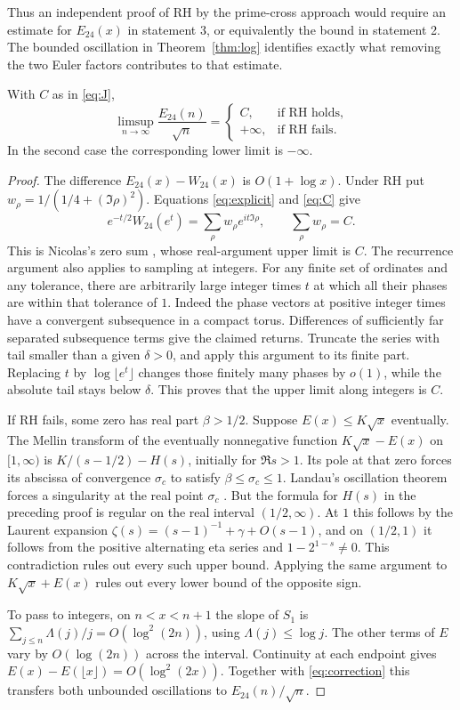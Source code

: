 Thus an independent proof of RH by the prime-cross approach would
require an estimate for $E_{24}(x)$ in statement 3, or equivalently
the bound in statement 2. The bounded oscillation in
Theorem~\ref{thm:log} identifies exactly what removing the two Euler
factors contributes to that estimate.
\begin{cor}\label{cor:limsup}
With $C$ as in \eqref{eq:J},
\[
 \limsup_{n\to\infty}\frac{E_{24}(n)}{\sqrt n}=
 \begin{cases}
 C,&\text{if RH holds},\\
 +\infty,&\text{if RH fails}.
 \end{cases}
\]
In the second case the corresponding lower limit is $-\infty$.
\end{cor}
\begin{proof}
The difference $E_{24}(x)-W_{24}(x)$ is $O(1+\log x)$.
Under RH put $w_\rho=1/(1/4+(\Im\rho)^2)$. Equations
\eqref{eq:explicit} and \eqref{eq:C} give
\[
 e^{-t/2}W_{24}(e^t)=\sum_\rho w_\rho e^{it\Im\rho},
 \qquad \sum_\rho w_\rho=C.
\]
This is Nicolas's zero sum \cite[(1.18)--(1.19), Section~4]{nicolas},
whose real-argument upper limit is $C$. The recurrence argument also
applies to sampling at integers. For any finite set of ordinates and any tolerance, there are
arbitrarily large integer times $t$ at which all their phases are
within that tolerance of $1$. Indeed the phase vectors at positive
integer times have a convergent subsequence in a compact torus.
Differences of sufficiently far separated subsequence terms give the
claimed returns. Truncate the series with tail smaller than a given
$\delta>0$, and apply this argument to its finite part. Replacing
$t$ by $\log\lfloor e^t\rfloor$ changes those finitely many phases
by $o(1)$, while the absolute tail stays below $\delta$. This proves
that the upper limit along integers is $C$.

If RH fails, some zero has real part $\beta>1/2$. Suppose
$E(x)\leq K\sqrt{x}$ eventually. The Mellin transform of the
eventually nonnegative function $K\sqrt{x}-E(x)$ on $[1,\infty)$
is $K/(s-1/2)-H(s)$, initially for $\Re s>1$. Its pole at that zero
forces its abscissa of convergence $\sigma_c$ to satisfy
$\beta\leq\sigma_c\leq1$. Landau's oscillation theorem forces a
singularity at the real point $\sigma_c$ \cite[Theorem 3]{lay}.
But the formula for $H(s)$ in the preceding proof is regular on
the real interval $(1/2,\infty)$. At $1$ this follows by the
Laurent expansion $\zeta(s)=(s-1)^{-1}+\gamma+O(s-1)$, and on
$(1/2,1)$ it follows from the positive alternating eta series and
$1-2^{1-s}\ne0$. This contradiction rules out every such upper
bound. Applying the same argument to $K\sqrt{x}+E(x)$ rules out
every lower bound of the opposite sign.

To pass to integers, on $n<x<n+1$ the slope of $S_1$ is
$\sum_{j\leq n}\Lambda(j)/j=O(\log^2(2n))$, using
$\Lambda(j)\leq\log j$. The other terms of $E$ vary by
$O(\log(2n))$ across the interval. Continuity at each endpoint
gives $E(x)-E(\lfloor x\rfloor)=O(\log^2(2x))$. Together with
\eqref{eq:correction} this transfers both unbounded oscillations to
$E_{24}(n)/\sqrt n$.
\end{proof}
